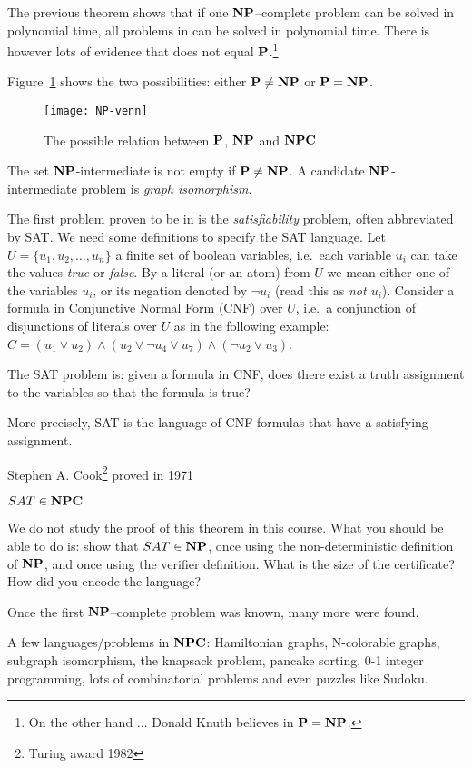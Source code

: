 The previous theorem shows that if one $\NP$--complete
problem can be solved in polynomial time, all problems in \NP can be
solved in polynomial time. There is however lots of evidence that \NP
does not equal $\P$.\footnote{On the other hand ... Donald Knuth
believes in $\P = \NP$.}

Figure~\ref{NP-venn} shows the two possibilities: either $\P \neq \NP$
or $\P = \NP$.

\begin{figure}[ht]
	\centering
	\texttt{[image: NP-venn]}
	\caption{The possible relation between $\P$, $\NP$ and $\NPC$
	 \label{NP-venn}}
\end{figure}
The set $\NP$-intermediate is not empty if $\P \neq \NP$. A candidate
$\NP$-intermediate problem is {\em graph isomorphism}.

The first problem proven to be in \NPC is the {\em satisfiability}
problem, often abbreviated by SAT. We need some definitions to specify
the SAT language. Let $U = \{u_1,u_2,\ldots,u_n\}$ a finite set of
boolean variables, i.e.\ each variable $u_i$ can take the values {\em
true} or {\em false}.  By a literal (or an atom) from $U$ we mean either one
of the variables $u_i$, or its negation denoted by $\neg {u}_i$ (read
this as {\em not $u_i$}). Consider a formula in Conjunctive Normal
Form (CNF) over $U$, i.e.\ a conjunction of disjunctions of literals
over $U$ as in the following example:
%
$C= (u_1 \vee u_2) \wedge (u_2 \vee \neg u_4 \vee u_7) \wedge  (\neg u_2 \vee u_3)$.

The SAT problem is: given a formula in CNF, does there exist a truth
assignment to the variables so that the formula is true?

More precisely, SAT is the language of CNF formulas that have a
satisfying assignment.

Stephen A. Cook\footnote{Turing award 1982} proved in 1971

\begin{theorem}
$SAT \in \NPC$
\end{theorem}

We do not study the proof of this theorem in this course. What you
should be able to do is: show that $SAT \in \NP$, once using the
non-deterministic definition of $\NP$, and once using the verifier
definition. What is the size of the certificate? How did you encode
the language?

Once the first $\NP$--complete problem was known, many more
were found.
\begin{example}
A few languages/problems in $\NPC$: Hamiltonian
graphs, N-colorable graphs, subgraph isomorphism, the knapsack
problem, pancake sorting, 0-1 integer programming, lots of
combinatorial problems and even puzzles like Sudoku.
\end{example}

